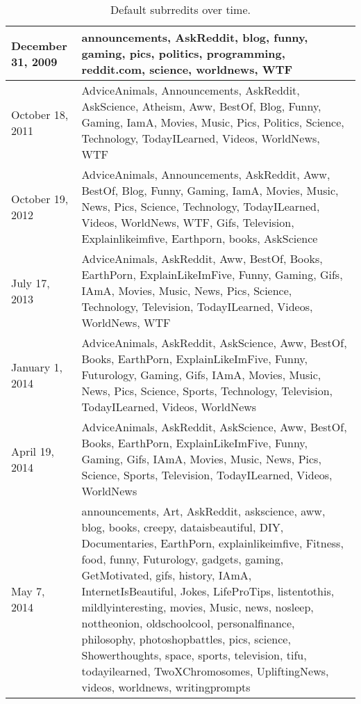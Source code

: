\begin{table}[htbp]
\centering
\tabcolsep=0.11cm
\singlespacing
\fontsize{7pt}{8pt}\selectfont
\begin{tabular}{|>{\raggedright\centering\arraybackslash}m{1.5cm}|m{6.8cm}|}
\hline
December 31, 2009 & announcements, AskReddit, blog, funny, gaming, pics, politics, programming, reddit.com, science, worldnews, WTF \\ \hline
October 18, 2011 & AdviceAnimals, Announcements, AskReddit, AskScience, Atheism, Aww, BestOf, Blog, Funny, Gaming, IamA, Movies, Music, Pics, Politics, Science, Technology, TodayILearned, Videos, WorldNews, WTF \\ \hline
October 19, 2012 & AdviceAnimals, Announcements, AskReddit, Aww, BestOf, Blog, Funny, Gaming, IamA, Movies, Music, News, Pics, Science, Technology, TodayILearned, Videos, WorldNews, WTF, Gifs, Television, Explainlikeimfive, Earthporn, books, AskScience \\ \hline
July 17, 2013 & AdviceAnimals, AskReddit, Aww, BestOf, Books, EarthPorn, ExplainLikeImFive, Funny, Gaming, Gifs, IAmA, Movies, Music, News, Pics, Science, Technology, Television, TodayILearned, Videos, WorldNews, WTF \\ \hline
January 1, 2014 & AdviceAnimals, AskReddit, AskScience, Aww, BestOf, Books, EarthPorn, ExplainLikeImFive, Funny, Futurology, Gaming, Gifs, IAmA, Movies, Music, News, Pics, Science, Sports, Technology, Television, TodayILearned, Videos, WorldNews \\ \hline
April 19, 2014 & AdviceAnimals, AskReddit, AskScience, Aww, BestOf, Books, EarthPorn, ExplainLikeImFive, Funny, Gaming, Gifs, IAmA, Movies, Music, News, Pics, Science, Sports, Television, TodayILearned, Videos, WorldNews \\ \hline
May 7, 2014 & announcements, Art, AskReddit, askscience, aww, blog, books, creepy, dataisbeautiful, DIY, Documentaries, EarthPorn, explainlikeimfive, Fitness, food, funny, Futurology, gadgets, gaming, GetMotivated, gifs, history, IAmA, InternetIsBeautiful, Jokes, LifeProTips, listentothis, mildlyinteresting, movies, Music, news, nosleep, nottheonion, oldschoolcool, personalfinance, philosophy, photoshopbattles, pics, science, Showerthoughts, space, sports, television, tifu, todayilearned, TwoXChromosomes, UpliftingNews, videos, worldnews, writingprompts \\ \hline
\end{tabular}
\caption{Default subrredits over time.}
\end{table}
